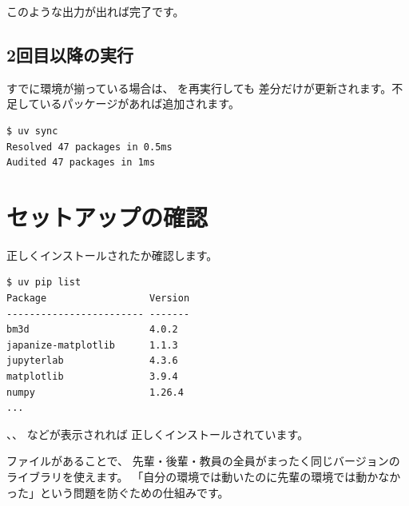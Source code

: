 このような出力が出れば完了です。

\subsection{2回目以降の実行}

すでに環境が揃っている場合は、 を再実行しても
差分だけが更新されます。不足しているパッケージがあれば追加されます。

\begin{wslbox}[2回目以降の出力例]
\begin{lstlisting}[style=bash]
$ uv sync
Resolved 47 packages in 0.5ms
Audited 47 packages in 1ms
\end{lstlisting}
\end{wslbox}

\section{セットアップの確認}

正しくインストールされたか確認します。

\begin{wslbox}[インストール済みパッケージの確認]
\begin{lstlisting}[style=bash]
$ uv pip list
Package                  Version
------------------------ -------
bm3d                     4.0.2
japanize-matplotlib      1.1.3
jupyterlab               4.3.6
matplotlib               3.9.4
numpy                    1.26.4
...
\end{lstlisting}
\end{wslbox}

、、 などが表示されれば
正しくインストールされています。

\begin{tipbox}
 ファイルがあることで、
先輩・後輩・教員の全員がまったく同じバージョンのライブラリを使えます。
「自分の環境では動いたのに先輩の環境では動かなかった」という問題を防ぐための仕組みです。
\end{tipbox}
